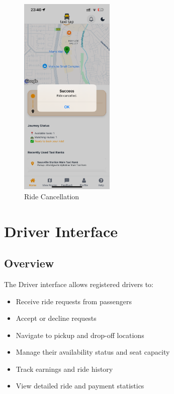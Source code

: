 \documentclass[12pt]{article}
\begin{document}
\begin{figure}[H]
  \centering
  \includegraphics[width=0.4\textwidth]{ride_cancelled.png}
  \caption{Ride Cancellation}
\end{figure}

\section{Driver Interface}

\subsection{Overview}
The Driver interface allows registered drivers to:
\begin{itemize}
    \item Receive ride requests from passengers
    \item Accept or decline requests
    \item Navigate to pickup and drop-off locations
    \item Manage their availability status and seat capacity
    \item Track earnings and ride history
    \item View detailed ride and payment statistics
\end{itemize}
\end{document}
